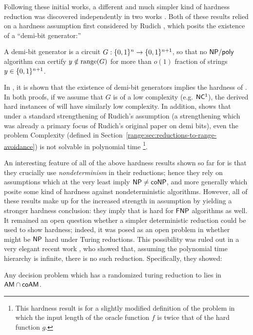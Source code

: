 Following these initial works, a different and much simpler kind of hardness reduction was discovered independently in two works \cite{Ilango25ODH,RWZ26}. Both of these results relied on a hardness assumption first considered by Rudich \cite{Rudich97}, which posits the existence of a ``demi-bit generator:''
\begin{definition}
A demi-bit generator is a circuit $G: \{0,1\}^n \to \{0,1\}^{n+1}$, so that no $\cl{NP/poly}$ algorithm can certify $y \notin \mathrm{range}(G)$ for more than $o(1)$ fraction of strings $y \in \{0,1\}^{n+1}$.
\end{definition}
In \cite{Ilango25ODH,RWZ26}, it is shown that the existence of demi-bit generators implies the hardness of \avoid. In both proofs, if we assume that $G$ is of a low complexity (e.g. $\cl{NC^1}$), the derived hard instances of \avoid will have similarly low complexity. 
In addition, \cite{Ilango25ODH} shows that under a standard strengthening of Rudich's assumption (a strengthening which was already a primary focus of Rudich's original paper on demi bits), even the problem {\sc Complexity} (defined in Section~\ref{range:sec:reductions-to-range-avoidance}) is not solvable in polynomial time \footnote{This hardness result is for a slightly modified definition of the problem in which the input length of the oracle function $f$ is twice that of the hard function $g$.}.

An interesting feature of all of the above hardness results shown so far for \avoid is that they crucially use \emph{nondeterminism} in their reductions; hence they rely on assumptions which at the very least imply $\cl{NP} \neq \cl{coNP}$, and more generally which posite some kind of hardness against nondeterministic algorithms. However, all of these results make up for the increased strength in assumption by yielding a stronger hardness conclusion: they imply that \avoid is hard for $\cl{FNP}$ algorithms as well. It remained an open question whether a simpler deterministic reduction could be used to show hardness; indeed, it was posed as an open problem in \cite{KortenSurvey25} whether \avoid might be $\cl{NP}$ hard under Turing reductions. This possibility was ruled out in a very elegant recent work \cite{GLS25}, who showed that, assuming the polynomial time hierarchy is infinite, there is no such reduction. Specifically, they showed:
\begin{theorem}
Any decision problem which has a randomized turing reduction to \avoid lies in $\cl{AM \cap coAM}$.
\end{theorem}

